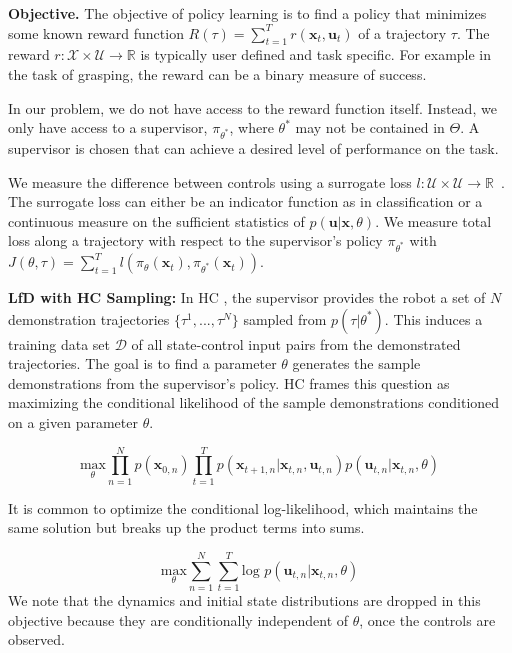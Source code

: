 \documentclass[10pt, conference]{ieeeconf}      %
\newcommand{\bu}{\mathbf{u}}
\newcommand{\bx}{\mathbf{x}}
\newcommand{\ns}{HC }
\begin{document}
\noindent\textbf{Objective.} The objective of policy learning is to find a policy that minimizes some known reward function $R(\tau) = \sum^T_{t=1} r(\bx_t,\bu_t)$ of a trajectory $\tau$. The reward $r:\mathcal{X}\times \mathcal{U}\to \mathbb{R}$ is typically user defined and task specific. 
For example in the task of grasping, the reward can be a binary measure of success.

In our problem, we do not have access to the reward function itself. Instead, we only have access to 
a supervisor, $\pi_{\theta^*}$, where $\theta^*$ may not be contained in $\Theta$. A supervisor is chosen that can achieve a desired level of performance on the task.

We measure the difference between controls using a surrogate loss $l : \mathcal{U} \times \mathcal{U} \rightarrow \mathbb{R}$~\cite{ross2010reduction,ross2010efficient}.
The surrogate loss can either be an indicator function as in classification or a continuous measure on the sufficient statistics of $p(\bu|\bx,\theta)$.
We measure total loss along a trajectory with respect to the supervisor's policy $\pi_{\theta^*}$ with $J(\theta, \tau) = \sum^T_{t=1} l(\pi_{\theta}(\bx_{t}),\pi_{\theta^*}(\bx_{t}))$.

\noindent \textbf{LfD with \ns Sampling:} In \ns, the supervisor provides the robot a set of $N$ demonstration trajectories $\lbrace \tau^1,...,\tau^N \rbrace$ sampled from $p(\tau | \theta^*)$.
This induces a training data set $\mathcal{D}$ of all state-control input pairs from the demonstrated trajectories.
The goal is to find a parameter $\theta$ generates the sample demonstrations from the supervisor's policy.
\ns frames this  question as maximizing the conditional likelihood of the sample demonstrations conditioned on a given parameter $\theta$. 

$$\underset{\theta}{\mbox{max}} \prod^N_{n=1} p(\bx_{0,n}) \prod^T_{t=1} p(\bx_{t+1,n}|\bx_{t,n},\bu_{t,n})p(\bu_{t,n}|\bx_{t,n},\theta)$$

It is common to optimize the conditional log-likelihood, which maintains the same solution but breaks up the product terms into sums. 

\begin{equation}\label{eq:m_likeli_obj}
\underset{\theta}{\mbox{max}} \sum^N_{n=1}\sum^T_{t=1}\mbox{log }p(\bu_{t,n}|\bx_{t,n},\theta)
\end{equation}
\noindent We note that the dynamics and initial state distributions are dropped in this objective because they are conditionally independent of $\theta$, once the controls are observed. 
\end{document}
